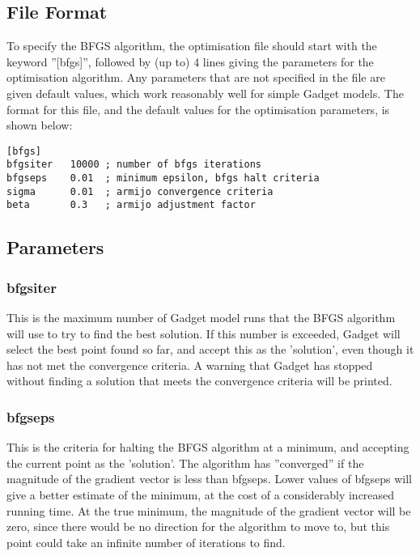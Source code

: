 \documentclass [a4paper, 10pt]{book}
\begin{document}
\subsection{File Format}\label{subsec:bfgsfile}
To specify the BFGS algorithm, the optimisation file should start with the keyword ''[bfgs]'', followed by (up to) 4 lines giving the parameters for the optimisation algorithm.  Any parameters that are not specified in the file are given default values, which work reasonably well for simple Gadget models.  The format for this file, and the default values for the optimisation parameters, is shown below:

{\small\begin{verbatim}
[bfgs]
bfgsiter   10000 ; number of bfgs iterations
bfgseps    0.01  ; minimum epsilon, bfgs halt criteria
sigma      0.01  ; armijo convergence criteria
beta       0.3   ; armijo adjustment factor
\end{verbatim}}

\subsection{Parameters}\label{subsec:bfgspar}
\subsubsection{bfgsiter}
This is the maximum number of Gadget model runs that the BFGS algorithm will use to try to find the best solution.  If this number is exceeded, Gadget will select the best point found so far, and accept this as the 'solution', even though it has not met the convergence criteria.  A warning that Gadget has stopped without finding a solution that meets the convergence criteria will be printed.

\subsubsection{bfgseps}
This is the criteria for halting the BFGS algorithm at a minimum, and accepting the current point as the 'solution'.  The algorithm has ''converged'' if the magnitude of the gradient vector is less than bfgseps.  Lower values of bfgseps will give a better estimate of the minimum, at the cost of a considerably increased running time.  At the true minimum, the magnitude of the gradient vector will be zero, since there would be no direction for the algorithm to move to, but this point could take an infinite number of iterations to find.
\end{document}
